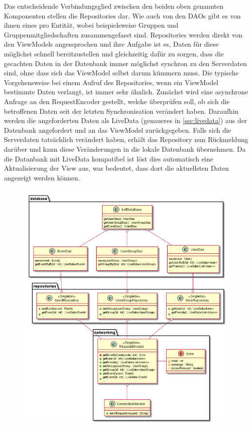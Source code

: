 \documentclass[parskip=full,11pt]{scrartcl}
\begin{document}
Das entscheidende Verbindungsglied zwischen den beiden oben genannten
Komponenten stellen die Repositories dar. Wie auch von den DAOs gibt es von
ihnen eines pro Entität, wobei beispielsweise Gruppen und
Gruppenmitgliedschaften zusammengefasst sind. Repositories werden
direkt von den ViewModels angessprochen und ihre Aufgabe ist es, Daten für diese
möglichst schnell bereitzustellen und gleichzeitig dafür zu sorgen, dass die
gecachten Daten in der Datenbank immer möglichst synchron zu den Serverdaten
sind, ohne dass sich das ViewModel selbst darum kümmern muss. Die typische
Vorgehensweise bei einem Aufruf des Repositories, wenn ein ViewModel bestimmte
Daten verlangt, ist immer sehr ähnlich. Zunächst wird eine asynchrone Anfrage
an den RequestEncoder gestellt, welche überprüfen soll, ob sich die betroffenen
Daten seit der letzten Synchronisation verändert haben. Daraufhin werden die
angeforderten Daten als LiveData (genaueres in \ref{sec:livedata}) aus der
Datenbank angefordert und an das
ViewModel zurückgegeben. Falls sich die Serverdaten tatsächlich verändert
haben, erhält das Repository nun Rückmeldung darüber und kann diese
Veränderungen in die lokale Datenbank übernehmen. Da die Datanbank mit LiveData
kompatibel ist löst dies automatisch eine Aktualisierung der View aus, was
bedeutet, dass dort die aktuellsten Daten angezeigt werden können.

\begin{figure}
	\centering
	\includegraphics[width = \columnwidth]{model.png}
	\label{fig:model}
\end{figure}
\end{document}
